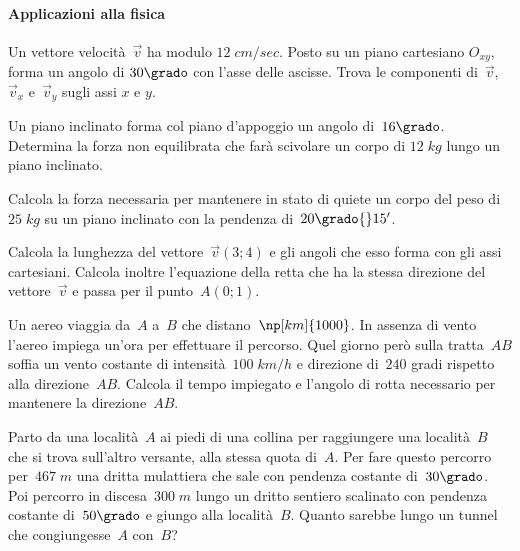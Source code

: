 \paragraph{Applicazioni alla fisica}
\begin{multicols}{2}
\begin{esercizio}
\label{ese:C.37}
Un vettore velocità~$\vec{v}$ ha modulo $12\;\unit{cm/sec}$. Posto su un piano cartesiano $O_{xy}$, forma un angolo di $30\grado$ con
l'asse delle ascisse. Trova le componenti di~$\vec{v}$, $\vec{v}_x$ e~$\vec{v}_y$ sugli assi $x$ e $y$.
\end{esercizio}

\begin{esercizio}
\label{ese:C.38}
Un piano inclinato forma col piano d'appoggio un angolo di~$16\grado$. Determina la forza non equilibrata che farà scivolare un corpo di
$12\;\unit{kg}$ lungo un piano inclinato.
\end{esercizio}

\begin{esercizio}
\label{ese:C.39}
Calcola la forza necessaria per mantenere in stato di quiete un corpo del peso di~$25\;\unit{kg}$ su un piano inclinato con
la pendenza di~$20\grado{}15'$.
\end{esercizio}

\begin{esercizio}
\label{ese:C.40}
Calcola la lunghezza del vettore~$\vec{v}(3;4)$ e gli angoli che esso forma con gli assi cartesiani.
Calcola inoltre l'equazione della retta che ha la stessa direzione del vettore~$\vec{v}$ e passa per il punto~$A(0;1)$.
\end{esercizio}

\begin{esercizio}
\label{ese:C.41}
Un aereo viaggia da~$A$ a~$B$ che distano~$\np[km]{1000}$. In assenza di vento l'aereo impiega un'ora per effettuare il percorso.
Quel giorno però sulla tratta~$AB$ soffia un vento costante di intensità~$100\;\unit{km/h}$ e direzione di~$240$ gradi
rispetto alla direzione~$AB$. Calcola il tempo impiegato e l'angolo di rotta necessario per mantenere la direzione~$AB$.
\end{esercizio}


\begin{esercizio}[\Ast]
\label{ese:C.42}
Parto da una località~$A$ ai piedi di una collina per raggiungere una località~$B$ che si trova sull'altro versante,
alla stessa quota di~$A$. Per fare questo percorro per~$467\;\unit{m}$ una dritta mulattiera che sale con pendenza costante di~$30\grado$.
Poi percorro in discesa~$300\;\unit{m}$ lungo un dritto sentiero scalinato con pendenza costante di~$50\grado$ e giungo alla località~$B$.
Quanto sarebbe lungo un tunnel che congiungesse~$A$ con~$B$?
\begin{center}
 
\end{center}
\end{esercizio}


\end{multicols}
